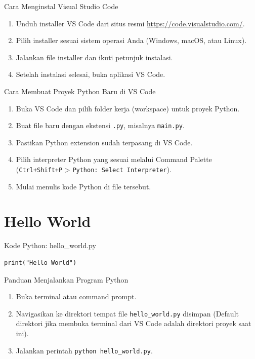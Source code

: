 \documentclass[aspectratio=169, table]{beamer}
\begin{document}
\begin{frame}[fragile]{Cara Menginstal Visual Studio Code}
\begin{enumerate}
\item Unduh installer VS Code dari situs resmi \url{https://code.visualstudio.com/}.
\item Pilih installer sesuai sistem operasi Anda (Windows, macOS, atau Linux).
\item Jalankan file installer dan ikuti petunjuk instalasi.
\item Setelah instalasi selesai, buka aplikasi VS Code.
\end{enumerate}
\end{frame}

\begin{frame}[fragile]{Cara Membuat Proyek Python Baru di VS Code}
\begin{enumerate}
\item Buka VS Code dan pilih folder kerja (workspace) untuk proyek Python.
\item Buat file baru dengan ekstensi \texttt{.py}, misalnya \texttt{main.py}.
\item Pastikan Python extension sudah terpasang di VS Code.
\item Pilih interpreter Python yang sesuai melalui Command Palette (\texttt{Ctrl+Shift+P} > \texttt{Python: Select Interpreter}).
\item Mulai menulis kode Python di file tersebut.
\end{enumerate}
\end{frame}

\section{Hello World}
\begin{frame}[fragile]{Kode Python: hello_world.py}
\begin{lstlisting}[style=PythonStyle]
print("Hello World")
\end{lstlisting}
\end{frame}

\begin{frame}[fragile]{\LARGE{Panduan Menjalankan Program Python}}
\begin{enumerate}
\item Buka terminal atau command prompt.
\item Navigasikan ke direktori tempat file \texttt{hello_world.py} disimpan (Default direktori jika membuka terminal dari VS Code adalah direktori proyek saat ini). 
\item Jalankan perintah \texttt{python hello_world.py}.
\end{enumerate}
\end{frame}
\end{document}
